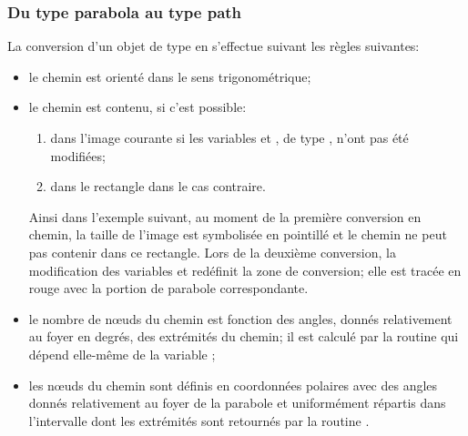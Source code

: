 \documentclass[pdftex]{article}
\begin{document}
\subsubsection{\texorpdfstring{Du type \og{}parabola\fg{} au type
    \og{}path\fg{}}{Du type «parabola» au type «path»}}
La conversion d'un objet  de type  en 
s'effectue suivant les règles suivantes:
\begin{itemize}
\item le chemin est orienté dans le sens trigonométrique;
\item
  le chemin est contenu, si c'est possible:
  \begin{enumerate}
  \item dans l'image courante si les variables 
    et , de type , n'ont pas été modifiées;
  \item dans le rectangle  dans le cas
    contraire.
  \end{enumerate}
  Ainsi dans l'exemple suivant, au moment de la première conversion en
  chemin, la taille de l'image est symbolisée en pointillé et le
  chemin ne peut pas contenir dans ce rectangle. Lors de la deuxième
  conversion, la modification des variables 
  et  redéfinit la zone de conversion; elle est tracée
  en rouge avec la portion de parabole correspondante.
\item le nombre de n\oe{}uds du chemin est fonction des angles, donnés
  relativement au foyer en degrés, des extrémités du chemin; il est calculé par la routine
  \linebreak{}
  qui dépend elle-même de la variable
  ;
\item les n\oe{}uds du chemin sont définis en coordonnées polaires
  avec des angles donnés relativement au foyer de la parabole et
  uniformément répartis dans l'intervalle dont les extrémités sont
  retournés par la routine
  .
\end{itemize}
\end{document}
